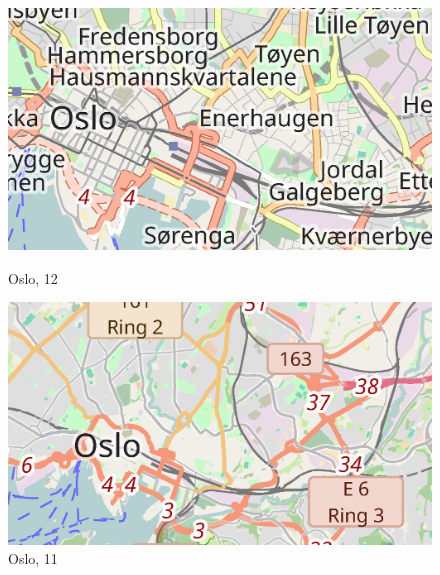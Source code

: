 \documentclass[../main/thesis.tex]{subfiles}
\begin{document}


\begin{figure}[ht]
  \begin{minipage}{.5\linewidth}
    \centering
    \includegraphics[width=\ScaleIfNeeded]{../chapter2/kampen-z12}
    \caption{Oslo,  12}\label{fig:kampen12}
  \end{minipage}%
  \begin{minipage}{.5\linewidth}
    \centering
    \includegraphics[width=\ScaleIfNeeded]{../chapter2/kampen-z11}
    \caption{Oslo,  11}\label{fig:kampen11}
  \end{minipage}
\end{figure}

\end{document}
